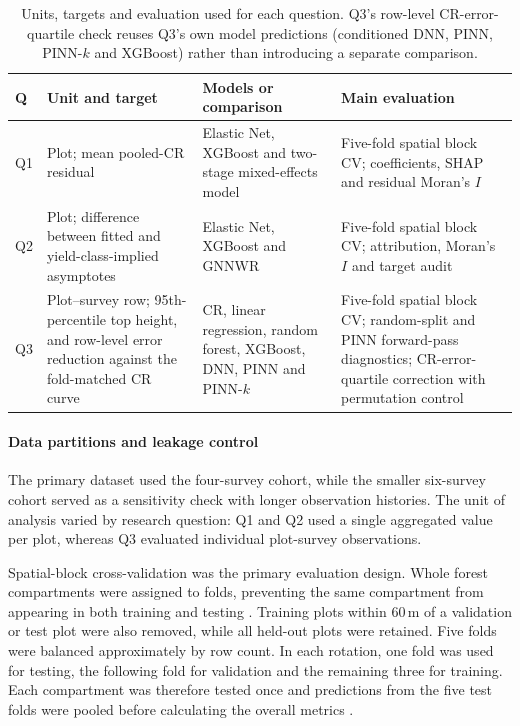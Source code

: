 \documentclass[logo,msc,ai]{infthesis}           %
\begin{document}
\begin{table}[!ht]
\centering
\footnotesize
\renewcommand{\arraystretch}{1.15}

\begin{tabularx}{\linewidth}{@{} l >{\raggedright\arraybackslash}X >{\raggedright\arraybackslash}X >{\raggedright\arraybackslash}X @{}}
\toprule
Q & Unit and target & Models or comparison & Main evaluation \\
\midrule
Q1 & Plot; mean pooled-CR residual & Elastic Net, XGBoost and two-stage
mixed-effects model & Five-fold spatial block CV; coefficients, SHAP and residual Moran's $I$ \\
Q2 & Plot; difference between fitted and yield-class-implied asymptotes & Elastic Net, XGBoost
and GNNWR & Five-fold spatial block CV; attribution, Moran's $I$ and target audit \\
Q3 & Plot--survey row; 95th-percentile top height, and row-level error reduction against the
fold-matched CR curve & CR, linear regression, random forest, XGBoost, DNN, PINN and PINN-$k$
& Five-fold spatial block CV; random-split and PINN forward-pass diagnostics; CR-error-quartile
correction with permutation control \\
\bottomrule
\end{tabularx}
\caption{\small{Units, targets and evaluation used for each question. Q3's row-level CR-error-quartile
check reuses Q3's own model predictions (conditioned DNN, PINN, PINN-$k$ and XGBoost) rather
than introducing a separate comparison.}}
\label{tab:rq-framework}
\end{table}

\paragraph*{Data partitions and leakage control} The primary dataset used the four-survey cohort, while the smaller six-survey cohort served as a sensitivity check with longer observation histories. The unit of analysis varied by research question: Q1 and Q2 used a single aggregated value per plot, whereas Q3 evaluated individual plot-survey observations.

Spatial-block cross-validation was the primary evaluation design. Whole forest compartments were assigned to folds, preventing the same compartment from appearing in both training and testing \cite{roberts2017Cross_C5_EVAL}. Training plots within 60\,m of a validation or test plot were also removed, while all held-out plots were retained. Five folds were balanced approximately by row count. In each rotation, one fold was used for testing, the following fold for validation and the remaining three for training. Each compartment was therefore tested once and predictions from the five test folds were pooled before calculating the overall metrics \cite{ploton2020Spatial_C5_EVAL}.
\end{document}
